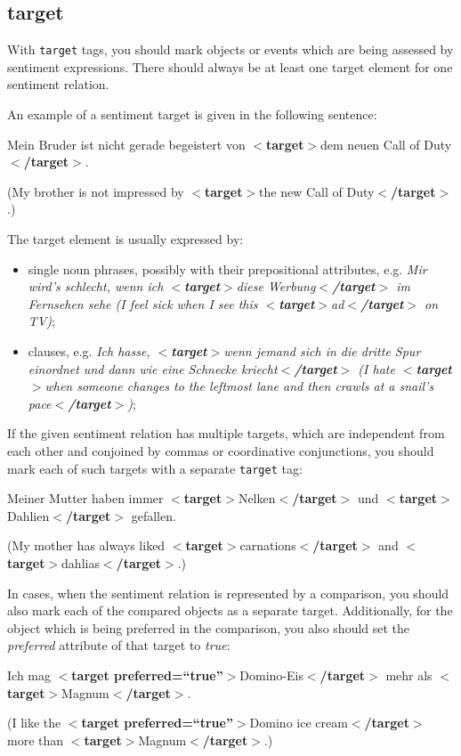 \documentclass[11pt,a4paper]{article}
\newcommand{\xmltag}[1]{{\textbf{\small$<$#1$>$}}}
\newcommand{\target}[1]{\xmltag{target}#1\xmltag{/target}}
\newenvironment{myexe}{
  \begin{exe}
    \ex\begin{center}
    \itshape
}{
    \end{center}
  \end{exe}
}
\begin{document}
\subsection{target}
With \texttt{target} tags, you should mark objects or events which are being
assessed by sentiment expressions.  There should always be at least one target
element for one sentiment relation.

An example of a sentiment target is given in the following sentence:
\begin{myexe}
Mein Bruder ist nicht gerade begeistert von \target{dem neuen Call of
  Duty}.

(My brother is not impressed by \target{the new Call of
  Duty}.)
\end{myexe}

The target element is usually expressed by:
\begin{itemize}
\item single noun phrases, possibly with their prepositional attributes,
  e.g. \textit{Mir wird's schlecht, wenn ich \target{diese Werbung} im
    Fernsehen sehe (I feel sick when I see this \target{ad} on TV)};

\item clauses, e.g. \textit{Ich hasse, \target{wenn jemand sich in die dritte
    Spur einordnet und dann wie eine Schnecke kriecht} (I hate \target{when
    someone changes to the leftmost lane and then crawls at a snail's pace})};
\end{itemize}

If the given sentiment relation has multiple targets, which are independent
from each other and conjoined by commas or coordinative conjunctions, you
should mark each of such targets with a separate \texttt{target} tag:
\begin{myexe}
  Meiner Mutter haben immer \target{Nelken} und \target{Dahlien}
  gefallen.

  (My mother has always liked \target{carnations} and
  \target{dahlias}.)
\end{myexe}

In cases, when the sentiment relation is represented by a comparison,
you should also mark each of the compared objects as a separate
target.  Additionally, for the object which is being preferred in the
comparison, you also should set the \textit{preferred} attribute of
that target to \textit{true}:
\begin{myexe}
  Ich mag $<$\textbf{target
    preferred=``true''}$>$Domino-Eis$<$\textbf{/target}$>$ mehr als
  \target{Magnum}.

  (I like the $<$\textbf{target preferred=``true''}$>$Domino ice
  cream$<$\textbf{/target}$>$ more than \target{Magnum}.)
\end{myexe}
\end{document}
